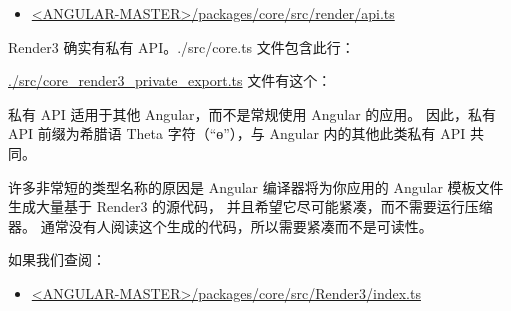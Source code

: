 \begin{itemize}
  \item \href{https://github.com/angular/angular/blob/master/packages/core/src/render/api.ts}
        {<ANGULAR-MASTER>/packages/core/src/render/api.ts}
\end{itemize}


Render3 确实有私有 API。./src/core.ts 文件包含此行：




\href{https://github.com/angular/angular/blob/master/packages/core/src/core_render3_private_export.ts}
{./src/core\_render3\_private\_export.ts}
文件有这个：




私有 API 适用于其他 Angular，而不是常规使用 Angular 的应用。
因此，私有 API 前缀为希腊语 Theta 字符（“ɵ”），与 Angular 内的其他此类私有 API 共同。


许多非常短的类型名称的原因是 Angular 编译器将为你应用的 Angular 模板文件生成大量基于 Render3 的源代码，
并且希望它尽可能紧凑，而不需要运行压缩器。
通常没有人阅读这个生成的代码，所以需要紧凑而不是可读性。


如果我们查阅：

\begin{itemize}
  \item \href{https://github.com/angular/angular/blob/master/packages/core/src/render3/index.ts}
        {<ANGULAR-MASTER>/packages/core/src/Render3/index.ts}
\end{itemize}


